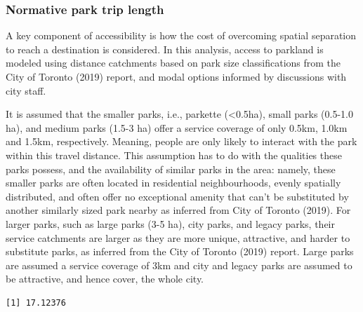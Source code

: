 \documentclass[
11pt, %
oneside, %
english, %
singlespacing, %
]{macthesis} %
\begin{document}
\subsubsection{Normative park trip length}\label{normative-park-trip-length}

A key component of accessibility is how the cost of overcoming spatial separation to reach a destination is considered. In this analysis, access to parkland is modeled using distance catchments based on park size classifications from the City of Toronto (2019) report, and modal options informed by discussions with city staff.

It is assumed that the smaller parks, i.e., parkette (\textless0.5ha), small parks (0.5-1.0 ha), and medium parks (1.5-3 ha) offer a service coverage of only 0.5km, 1.0km and 1.5km, respectively. Meaning, people are only likely to interact with the park within this travel distance. This assumption has to do with the qualities these parks possess, and the availability of similar parks in the area: namely, these smaller parks are often located in residential neighbourhoods, evenly spatially distributed, and often offer no exceptional amenity that can't be substituted by another similarly sized park nearby as inferred from City of Toronto (2019). For larger parks, such as large parks (3-5 ha), city parks, and legacy parks, their service catchments are larger as they are more unique, attractive, and harder to substitute parks, as inferred from the City of Toronto (2019) report. Large parks are assumed a service coverage of 3km and city and legacy parks are assumed to be attractive, and hence cover, the whole city.

\begin{verbatim}
[1] 17.12376
\end{verbatim}
\end{document}
